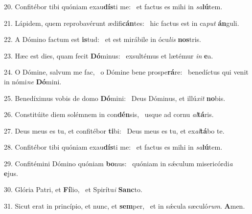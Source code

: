 20. Confitébor tibi quóniam exau\textbf{dís}ti me: \ast\  et factus es mihi in \textit{sa}\textbf{lú}tem.\

21. Lápidem, quem reprobavérunt ædifi\textbf{cán}tes: \ast\  hic factus est in ca\textit{put} \textbf{án}guli.\

22. A Dómino factum est \textbf{is}tud: \ast\  et est mirábile in ócu\textit{lis} \textbf{nos}tris.\

23. Hæc est dies, quam fecit \textbf{Dó}minus: \ast\  exsultémus et lætémur \textit{in} \textbf{e}a.\

24. O Dómine, salvum me fac, \dag\  o Dómine bene prospe\textbf{rá}re: \ast\  benedíctus qui venit in nómi\textit{ne} \textbf{Dó}mini.\

25. Benedíximus vobis de domo \textbf{Dó}mini: \ast\  Deus Dóminus, et illú\textit{xit} \textbf{no}bis.\

26. Constitúite diem solémnem in con\textbf{dén}sis, \ast\  usque ad cornu \textit{al}\textbf{tá}ris.\

27. Deus meus es tu, et confitébor \textbf{ti}bi: \ast\  Deus meus es tu, et ex\textit{al}\textbf{tá}bo te.\

28. Confitébor tibi quóniam exau\textbf{dís}ti me: \ast\  et factus es mihi in \textit{sa}\textbf{lú}tem.\

29. Confitémini Dómino quóniam \textbf{bo}nus: \ast\  quóniam in sǽculum misericórdi\textit{a} \textbf{e}jus.\

30. Glória Patri, et \textbf{Fí}lio, \ast\  et Spirítu\textit{i} \textbf{Sanc}to.\

31. Sicut erat in princípio, et nunc, et \textbf{sem}per, \ast\  et in sǽcula sæculó\textit{rum}. \textbf{A}men.\

